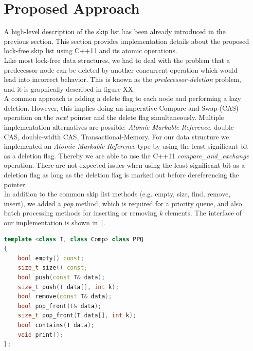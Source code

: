\section{Proposed Approach}\label{sec:approach}
A high-level description of the skip list has been already introduced in the previous section. This section provides implementation details about the proposed lock-free skip list using C++11 and its atomic operations.\\
Like most lock-free data structures, we had to deal with the problem that a predecessor node can be deleted by another concurrent operation which would lead into incorrect behavior. This is known as the {\em predecessor-deletion} problem, and it is graphically described in figure XX.\\%
A common approach is adding a delete flag to each node and performing a lazy deletion. However, this implies doing an imperative Compare-and-Swap (CAS) operation on the {\em next} pointer and the delete flag simultaneously. Multiple implementation alternatives are possible: {\em Atomic Markable Reference}, double CAS, double-width CAS, Transactional-Memory. For our data structure we implemented an {\em Atomic Markable Reference} type by using the least significant bit as a deletion flag. Thereby we are able to use the C++11 {\em compare\_and\_exchange} operation.
There are not expected issues when using the least significant bit as a deletion flag as long as the deletion flag is marked out before dereferencing the pointer.\\
In addition to the common skip list methods (e.g. empty, size, find, remove, insert), we added a \textit{pop} method, which is required for a priority queue, and also batch processing methods for inserting or removing \textit{k} elements. The interface of our implementation is shown in [].\\


\begin{lstlisting}[language=C++,basicstyle=\tt\footnotesize,captionpos=b,caption=PPQ interface,morekeywords={*, size_t}]
template <class T, class Comp> class PPQ
{
	bool empty() const;
	size_t size() const;
	bool push(const T& data);
	size_t push(T data[], int k);
	bool remove(const T& data);
	bool pop_front(T& data);
	size_t pop_front(T data[], int k);
	bool contains(T data);
	void print();
};
\end{lstlisting}

